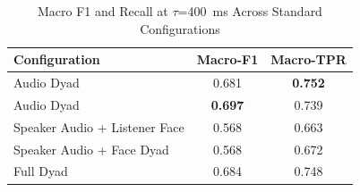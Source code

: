 \begin{table}[h]
\caption{Macro F1 and Recall at $\tau$=400~ms Across Standard Configurations}
\label{tab:macro_standard}
\small
\renewcommand{\arraystretch}{1.20}
\begin{tabular}{>{\raggedright\arraybackslash}p{4cm}cc}
\toprule
Configuration & Macro-F1 & Macro-TPR \\
\midrule
Audio Dyad & 0.681 & \textbf{0.752} \\
Audio Dyad & \textbf{0.697} & 0.739 \\
Speaker Audio + Listener Face & 0.568 & 0.663 \\
Speaker Audio + Face Dyad & 0.568 & 0.672 \\
Full Dyad & 0.684 & 0.748 \\
\bottomrule
\end{tabular}
\end{table}
